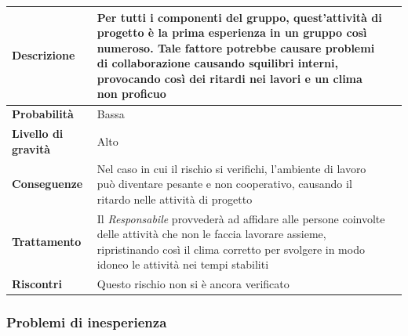 \begin{center}
	
	\begin{tabular}{|>{\centering}m{4cm} ||>{\centering}m{8cm} |>{\centering\arraybackslash}m{0pt}@{}|}
		\hline
		\textbf{Descrizione} & Per tutti i componenti del gruppo,
		quest’attività di progetto è la prima esperienza in un gruppo
		così numeroso. Tale fattore potrebbe causare problemi di
		collaborazione causando squilibri interni, provocando così dei
		ritardi nei lavori e un clima non proficuo & \\[2ex]
		\hline	
		\textbf{Probabilità} & Bassa &\\[1ex]
		\hline
		\textbf{Livello di gravità} & Alto & \\[1ex]
		\hline
		\textbf{Conseguenze} & Nel caso in cui il rischio si verifichi, l’ambiente di lavoro può diventare pesante e non cooperativo, causando il ritardo nelle attività di progetto & \\[1ex]
		\hline
		\textbf{Trattamento} & Il \emph{Responsabile}  provvederà ad affidare
		alle persone coinvolte delle attività che non le faccia
		lavorare assieme, ripristinando così il clima corretto per
		svolgere in modo idoneo le attività nei tempi stabiliti & \\[1ex] 
		\hline
		\textbf{Riscontri} & Questo rischio non si è ancora verificato & \\[1ex]
		\hline
	\end{tabular}
	
\end{center}

\subsubsection{Problemi di inesperienza}


